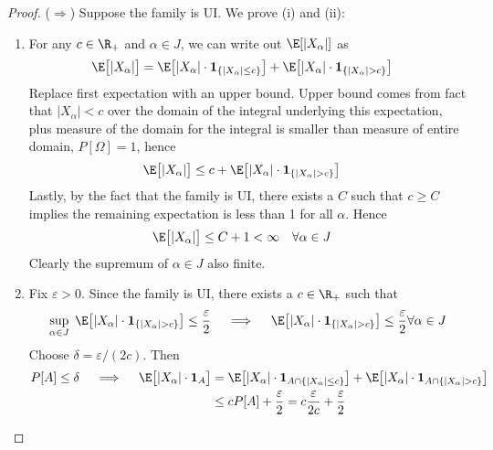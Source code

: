 \documentclass[12pt]{article}
\theoremstyle{plain}
\theoremstyle{definition}
\theoremstyle{remark}
\newcommand{\one}[1]{\mathbf{1}_{#1}}
\begin{document}
\begin{proof}
($\Rightarrow$)
Suppose the family is UI. We prove (i) and (ii):
\begin{enumerate}[label=(\roman*)]
  \item
    For any $c\in\R_{+}$ and $\alpha\in J$, we can write out
    $\E[|X_\alpha|]$ as
    \begin{align*}
      \E\big[|X_\alpha|\big]
      &=
      \E\big[ |X_\alpha|\cdot \one{\{|X_\alpha|\leq c\}}\big]
      + \E\big[ |X_\alpha|\cdot \one{\{|X_\alpha|> c\}}\big]
    \end{align*}
    Replace first expectation with an upper bound.  Upper bound comes
    from fact that $|X_\alpha|<c$ over the domain of the integral
    underlying this expectation, plus measure of the domain for the
    integral is smaller than measure of entire domain,
    $P[\Omega]=1$, hence
    \begin{align*}
      \E\big[|X_\alpha|\big]
      &\leq c + \E\big[ |X_\alpha|\cdot \one{\{|X_\alpha|> c\}}\big]
    \end{align*}
    Lastly, by the fact that the family is UI, there exists a
    $C$ such that $c\geq C$ implies the remaining expectation
    is less than 1 for all $\alpha$. Hence
    \begin{align*}
      \E\big[|X_\alpha|\big]
      &\leq C + 1<\infty
      \quad\forall \alpha\in J
    \end{align*}
    Clearly the supremum of $\alpha\in J$ also finite.
  \item
    Fix $\varepsilon>0$. Since the family is UI, there exists a
    $c\in\R_+$ such that
    \begin{align*}
      \sup_{\alpha\in J}\;
      \E\big[|X_\alpha|\cdot \one{\{|X_\alpha|>c\}} \big]
      \leq \frac{\varepsilon}{2}
      \quad\implies\quad
      \E\big[|X_\alpha|\cdot \one{\{|X_\alpha|>c\}} \big]
      \leq \frac{\varepsilon}{2}
      \forall \alpha\in J
    \end{align*}
    Choose $\delta =\varepsilon/(2c)$. Then
    \begin{align*}
      P[A]\leq \delta
      \quad\implies\quad
      \E\big[
        |X_\alpha|\cdot \one{A}
      \big]
      &=
      \E\big[
        |X_\alpha|\cdot \one{A\cap \{|X_\alpha|\leq c\}}
      \big]
      +
      \E\big[
        |X_\alpha|\cdot \one{A\cap \{|X_\alpha|>c\}}
      \big]
      \\
      &\leq
      c P[A]
      +
      \frac{\varepsilon}{2}
      =
      c \frac{\varepsilon}{2c}
      +
      \frac{\varepsilon}{2} \\

\end{align*}
\end{enumerate}
\end{proof}
\end{document}
